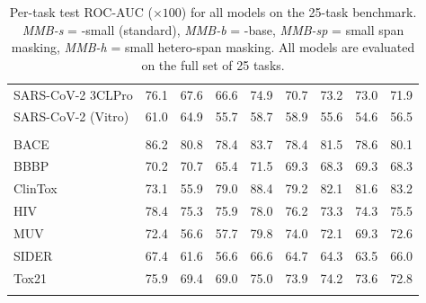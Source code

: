 {\begin{longtable}{l r r r r r r r r }
  SARS-CoV-2 3CLPro & 76.1 & 67.6 & 66.6 & 74.9 & 70.7 & 73.2 & 73.0 & 71.9 \\
  SARS-CoV-2 (Vitro) & 61.0 & 64.9 & 55.7 & 58.7 & 58.9 & 55.6 & 54.6 & 56.5 \\
  \addlinespace
  \multicolumn{9}{l}{\textit{MoleculeNet}} \\
  BACE & 86.2 & 80.8 & 78.4 & 83.7 & 78.4 & 81.5 & 78.6 & 80.1 \\
  BBBP & 70.2 & 70.7 & 65.4 & 71.5 & 69.3 & 68.3 & 69.3 & 68.3 \\
  ClinTox & 73.1 & 55.9 & 79.0 & 88.4 & 79.2 & 82.1 & 81.6 & 83.2 \\
  HIV & 78.4 & 75.3 & 75.9 & 78.0 & 76.2 & 73.3 & 74.3 & 75.5 \\
  MUV & 72.4 & 56.6 & 57.7 & 79.8 & 74.0 & 72.1 & 69.3 & 72.6 \\
  SIDER & 67.4 & 61.6 & 56.6 & 66.6 & 64.7 & 64.3 & 63.5 & 66.0 \\
  Tox21 & 75.9 & 69.4 & 69.0 & 75.0 & 73.9 & 74.2 & 73.6 & 72.8 \\
  \addlinespace
  \bottomrule
  \caption{Per-task test ROC-AUC ($\times100$) for all models on the 25-task benchmark. \emph{MMB-s} = \model{}-small (standard), \emph{MMB-b} = \model{}-base, \emph{MMB-sp} = small span masking, \emph{MMB-h} = small hetero-span masking. All models are evaluated on the full set of 25 tasks.}\label{tab:pertask}
\end{longtable}
}
